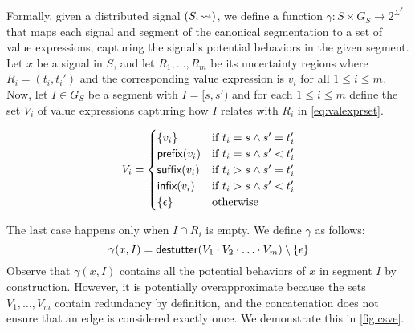 Formally, given a distributed signal $(S,{\rightsquigarrow})$, we define a function $\gamma : S \times G_S \to 2^{\Sigma^*}$ that maps each signal and segment of the canonical segmentation to a set of value expressions, capturing the signal's potential behaviors in the given segment.
Let $x$ be a signal in $S$, and let $R_1, \ldots, R_m$ be its uncertainty regions where $R_i = (t_i, t_i')$ and the corresponding value expression is $v_i$ for all $1 \leq i \leq m$.
Now, let $I \in G_S$ be a segment with $I = [s, s')$ and for each $1 \leq i \leq m$ define the set $V_i$ of value expressions capturing how $I$ relates with $R_i$ in \cref{eq:valexprset}.
%
\begin{wrapfigure}{r}{0.5\textwidth}
	\small
	\vspace{-2em}
	\begin{equation} \label{eq:valexprset}
		V_i = 
		\begin{cases}
			\{v_i\} & \text{if } t_i = s \land s' = t_i' \\
			\textsf{prefix}(v_i) & \text{if } t_i = s \land s' < t_i' \\
			\textsf{suffix}(v_i) & \text{if } t_i > s \land s' = t_i' \\
			\textsf{infix}(v_i) & \text{if } t_i > s \land s' < t_i' \\
			\{\epsilon\} & \text{otherwise}
		\end{cases}
	\end{equation}
	\vspace{-2em}
\end{wrapfigure}
\normalsize
The last case happens only when \( I \cap R_i \) is empty.
We define \(\gamma\) as follows:
\[ \gamma(x,I) = \mathsf{destutter}(V_1 \cdot V_2 \cdot \ldots \cdot V_m) \setminus \{\epsilon\} \]
Observe that \(\gamma(x,I)\) contains all the potential behaviors of \( x \) in segment \( I \) by construction.
However, it is potentially overapproximate because the sets \( V_1, \ldots, V_m \) contain redundancy by definition, and the concatenation does not ensure that an edge is considered exactly once.
We demonstrate this in \cref{fig:csve}.





